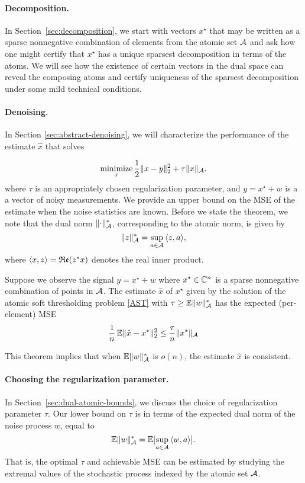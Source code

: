 \paragraph*{Decomposition.} In Section~\ref{sec:decomposition}, we start with
vectors $x^\star$ that may be written as a sparse nonnegative combination of
elements from the atomic set $\mathcal{A}$ and ask how one might certify that $x^\star$
has a unique sparsest decomposition in terms of the atoms. We will see how the
existence of certain vectors in the dual space can reveal the composing atoms
and certify uniqueness of the sparsest decomposition under some mild technical
conditions.

\paragraph*{Denoising.} In Section \ref{sec:abstract-denoising},
we will characterize the performance of the estimate $\hat{x}$ that solves

\begin{equation}
\label{AST}\mathop{\textrm{minimize}}_x \frac{1}{2} \lVert x - y\rVert_2^2 + \tau \lVert x\rVert_{\mathcal{A}}.
\end{equation}
where $\tau$ is an appropriately chosen regularization parameter, and $y =
x^\star + w$ is a a vector of noisy measurements. We provide an upper bound on
the MSE of the estimate when the noise statistics are known. Before we state the
theorem, we note that the dual norm $\lVert\cdot\rVert_{\mathcal{A}}^*$, corresponding to the
atomic norm, is given by
\[
 \lVert z\rVert_{\mathcal{A}}^* = \sup_{a \in \mathcal{A}}{\langle z, a\rangle},
\]
where $\langle x, z\rangle = \mathop{\mathfrak{Re}}(z^*x)$ denotes the real inner product.  

\begin{theorem}
\label{cor:expected-mse}

Suppose we observe the signal $y = x^\star + w$ where $x^\star \in \mathbb{C}^n$ is a
sparse nonnegative combination of points in $\mathcal{A}$. The estimate $\hat{x}$ of
$x^\star$ given by the solution of the atomic soft thresholding problem
\eqref{AST} with $\tau \geq \operatorname{\mathbb{E}} \lVert w\rVert_{\mathcal{A}}^*$ has the expected (per-element)
MSE
\[ 
\frac{1}{n}\operatorname{\mathbb{E}} \lVert\hat{x} - x^\star\rVert_2^2 \leq \frac{\tau}{n}\lVert x^\star\rVert_{\mathcal{A}}
\]

\end{theorem}

This theorem implies that when $\operatorname{\mathbb{E}} \lVert w\rVert_{\mathcal{A}}^*$ is $o(n)$, the estimate
$\hat{x}$ is consistent.

\paragraph*{Choosing the regularization parameter.} In 
Section~\ref{sec:dual-atomic-bounds}, we discuss the choice of regularization
parameter $\tau$. Our lower bound on $\tau$ is in terms of the expected dual norm of the noise process $w$, equal to
 \[
 	\operatorname{\mathbb{E}} \lVert w\rVert_{\mathcal{A}}^* = \mathbb{E}[\sup_{a\in \mathcal{A}} {\langle w, a\rangle}].
 \]
That is, the optimal $\tau$ and achievable MSE can be estimated
by studying the extremal values of the stochastic process indexed by the atomic
set $\mathcal{A}$.

